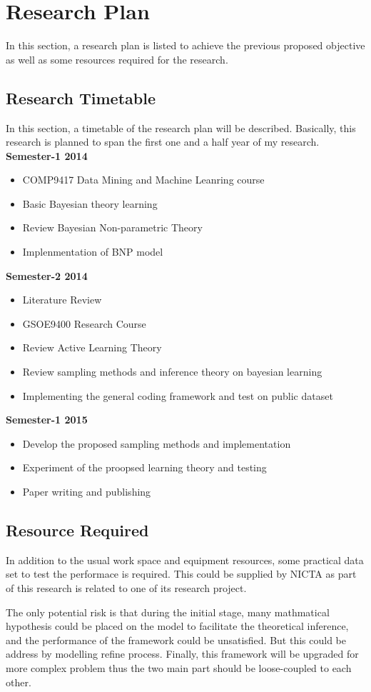 
\section{Research Plan}
In this section, a research plan is listed to achieve the previous proposed objective as well as some resources required for the research.
\subsection{Research Timetable}
In this section, a timetable of the research plan will be described. Basically, this research is planned to span the first one and a half year of my research.
\vskip 1cm
\textbf{\large{Semester-1 2014}}
\begin{itemize}
\item COMP9417 Data Mining and Machine Leanring course
\item Basic Bayesian theory learning
\item Review Bayesian Non-parametric Theory
\item Implenmentation of BNP model
\end{itemize}
\vskip 1cm
\textbf{\large{Semester-2 2014}}
\begin{itemize}
\item Literature Review
\item GSOE9400 Research Course
\item Review Active Learning Theory
\item Review sampling methods and inference theory on bayesian learning
\item Implementing the general coding framework and test on public dataset
\end{itemize}
\vskip 1cm
\textbf{\large{Semester-1 2015}}
\begin{itemize}
\item Develop the proposed sampling methods and implementation
\item Experiment of the proopsed learning theory and testing
\item Paper writing and publishing
\end{itemize}
\subsection{Resource Required}
In addition to the usual work space and equipment resources, some practical data set to test the performace is required. This could be supplied by NICTA as part of this research is related to one of its research project.

The only potential risk is that during the initial stage, many mathmatical hypothesis could be placed on the model to facilitate the theoretical inference, and the performance of the framework could be unsatisfied. But this could be address by modelling refine process. Finally, this framework will be upgraded for more complex problem thus the two main part should be loose-coupled to each other.   
